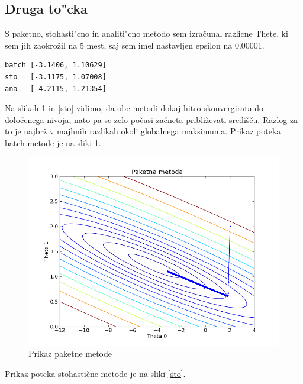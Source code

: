 \documentclass[a4paper,11pt]{article}
\begin{document}
\subsection{Druga to"cka}
S paketno, stohasti"cno in analiti"cno metodo sem izračunal razlicne Thete, ki sem jih zaokrožil na 5 mest, saj sem imel nastavljen epsilon na 0.00001.
\begin{verbatim}
batch [-3.1406, 1.10629]
sto   [-3.1175, 1.07008] 
ana   [-4.2115, 1.21354]
\end{verbatim}
Na slikah \ref{batch} in \ref{sto} vidimo, da obe metodi dokaj hitro skonvergirata do določenega nivoja, nato pa se zelo počasi začneta približevati središču. Razlog za to je najbrž v majhnih razlikah okoli globalnega maksimuma.
Prikaz poteka batch metode je na sliki \ref{batch}.
\begin{figure}[H]
\label{batch}
\begin{center}
\includegraphics[scale=0.3]{batch.png}
\caption{Prikaz paketne metode}
\end{center}

\end{figure}
Prikaz poteka stohastične metode je na sliki \ref{sto}.
\end{document}
